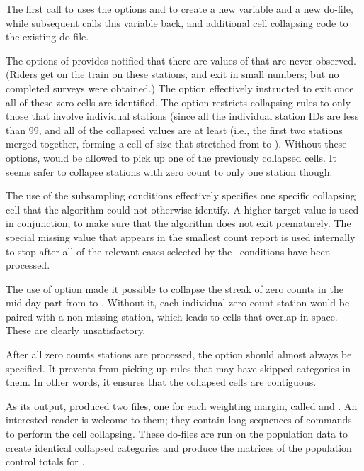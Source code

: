 The first call to  uses the options 
and  to create a new variable and a new do-file,
while subsequent calls  this variable back, and  additional
cell collapsing code to the existing do-file.

The  options of  provides
notified  that there are values of  that 
are never observed. (Riders get on the train on these stations, and exit in small numbers;
but no completed surveys were obtained.)
The  option effectively instructed  to exit
once all of these zero cells are identified. The  option
restricts collapsing rules to only those that involve individual stations 
(since all the individual station IDs are less than 99, and all of the collapsed values
are at least  (i.e., the first two stations merged together, forming 
a cell of size  that stretched from  to ). Without these options,
 would be allowed to pick up one of the previously collapsed cells.
It seems safer to collapse stations with zero count to only one station though.

The use of the subsampling conditions 
effectively specifies one specific collapsing cell that the algorithm could not otherwise 
identify. A higher target value  is used in conjunction, to make
sure that the algorithm does not exit prematurely.
The special missing value  that appears in the smallest count report is
used internally to stop  after all of the relevant cases
selected by the \ifexp\ conditions have been processed.

The use of  option made it possible to collapse the streak
of zero counts in the mid-day part from  to .
Without it, each individual zero count station would be paired with a non-missing station,
which leads to cells that overlap in space. These are clearly unsatisfactory.

After all zero counts stations are processed, the  option should almost
always be specified. It prevents  from picking up rules that
may have skipped categories in them. In other words, it ensures that the collapsed cells are 
contiguous.

As its output,  produced two files, one for each
weighting margin, called  and . An interested reader
is welcome to  them; they contain long sequences of 
commands to perform the cell collapsing. These do-files
are run on the population data to create identical collapsed categories and produce
the matrices of the population control totals for .



